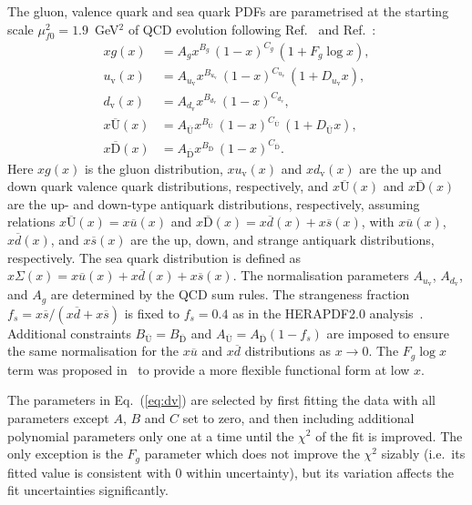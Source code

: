 \documentclass[12pt]{article}
\begin{document}
The gluon, valence quark and sea quark PDFs are parametrised at the starting scale $\mu^2_{f0} = 1.9$~GeV$^2$ of QCD evolution following Ref.~\cite{Abramowicz:2015mha} and Ref.~\cite{Bonvini:2019wxf}:
\begin{equation}\begin{aligned}
xg(x) &= A_{g} x^{B_{g}}\,(1-x)^{C_{g}}\, (1 + F_{g} {\log x}),\\
u_\mathrm{v}(x) &= A_{u_\mathrm{v}}x^{B_{u_\mathrm{v}}}\,(1-x)^{C_{u_\mathrm{v}}}\,(1+D_{u_\mathrm{v}}x) ,\\
d_\mathrm{v}(x) &= A_{d_\mathrm{v}}x^{B_{d_\mathrm{v}}}\,(1-x)^{C_{d_\mathrm{v}}},\\
x\overline{\mathrm{U}}(x)&= A_{\overline{\mathrm{U}}}x^{B_{\overline{\mathrm{U}}}}\, (1-x)^{C_{\overline{\mathrm{U}}}}\, (1+D_{\overline{\mathrm{U}}}x), \\
x\overline{\mathrm{D}}(x)&= A_{\overline{\mathrm{D}}}x^{B_{\overline{\mathrm{D}}}}\, (1-x)^{C_{\overline{\mathrm{D}}}}.
\end{aligned}
\label{eq:dv}
\end{equation}
Here $xg(x)$ is the gluon distribution, $xu_{\mathrm{v}}(x)$ and $xd_{\mathrm{v}}(x)$ are the up and down quark valence quark distributions, respectively, and $x\overline{\mathrm{U}}(x)$ and $x\overline{\mathrm{D}}(x)$ are 
the up- and down-type antiquark distributions, respectively, assuming relations $x\overline{\mathrm{U}}(x) = x\overline{u}(x)$ and $x\overline{\mathrm{D}}(x) = x\overline{d}(x) + x\overline{s}(x)$, with $x\overline{u}(x)$, $x\overline{d}(x)$, and $x\overline{s}(x)$ are the up, down, and strange antiquark distributions, respectively.
The sea quark distribution is defined as $x\Sigma(x)=x\overline{u}(x)+x\overline{d}(x)+x\overline{s}(x)$.
The normalisation parameters $A_{u_{\mathrm{v}}}$, $A_{d_\mathrm{v}}$, and $A_{g}$ are determined by the QCD sum rules.
The strangeness fraction $f_{s} = x\overline{s}/( x\overline{d} + x\overline{s})$ is fixed to
$f_{s}=0.4$ as in the HERAPDF2.0 analysis~\cite{Abramowicz:2015mha}.
Additional constraints $B_{\overline{\mathrm{U}}} = B_{\overline{\mathrm{D}}}$ and $A_{\overline{\mathrm{U}}} = A_{\overline{\mathrm{D}}}(1 - f_{s})$ are imposed to ensure the same normalisation for the $x\overline{u}$ and $x\overline{d}$ distributions as $x \to 0$.
The $F_g\log x$ term was proposed in~\cite{Bonvini:2019wxf} to provide a more flexible functional form at low $x$.

The parameters in Eq.~(\ref{eq:dv}) are selected by first fitting the data with all parameters except $A$, $B$ and $C$ set to zero, and then including additional polynomial parameters only one at a time until the $\chi^2$ of the fit is improved.
 The only exception is the $F_{g}$ parameter which does not improve the $\chi^2$ sizably (i.e.\ its fitted value is consistent with $0$ within uncertainty), but its variation affects the fit uncertainties significantly.
 
\end{document}
